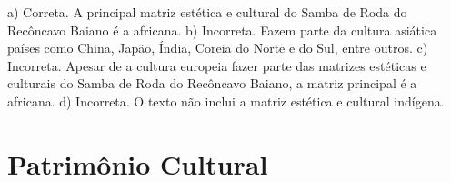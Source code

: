 \begin{escolha}
{a) Correta. A principal matriz estética e cultural do Samba de Roda do
Recôncavo Baiano é a africana.
b) Incorreta. Fazem parte da cultura asiática países como China,
Japão, Índia, Coreia do Norte e do Sul, entre outros.
c) Incorreta. Apesar de a cultura europeia fazer parte das matrizes
estéticas e culturais do Samba de Roda do Recôncavo Baiano, a matriz
principal é a africana.
d) Incorreta. O texto não inclui a matriz estética e cultural indígena.}

\chapter{Patrimônio Cultural}

\end{escolha}
